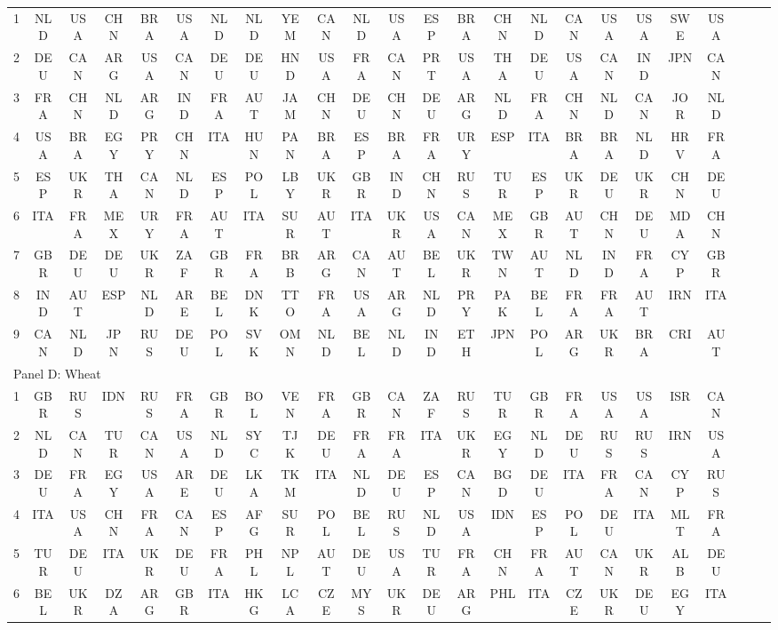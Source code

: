 \documentclass[preprint,3p,times,sort&compress]{elsarticle}
\begin{document}
\begin{table}[!ht]
\begin{tabular}{cccccccccccccccccccccccc}
      1 & NLD & USA & CHN & BRA & USA & NLD & NLD & YEM & CAN & NLD & USA & ESP & BRA & CHN & NLD & CAN & USA & USA & SWE & USA \\   
        2 & DEU & CAN & ARG & USA & CAN & DEU & DEU & HND & USA & FRA  & CAN & PRT & USA & THA & DEU & USA & CAN & IND & JPN & CAN \\  
        3 & FRA & CHN & NLD & ARG & IND & FRA & AUT & JAM & CHN & DEU & CHN & DEU & ARG & NLD & FRA & CHN & NLD & CAN & JOR & NLD \\  
        4 & USA & BRA & EGY & PRY & CHN & ITA & HUN & PAN & BRA & ESP & BRA & FRA & URY & ESP & ITA & BRA & BRA & NLD & HRV & FRA \\ 
        5 & ESP & UKR & THA & CAN & NLD & ESP & POL & LBY & UKR & GBR & IND & CHN & RUS & TUR & ESP & UKR & DEU & UKR & CHN & DEU \\ 
        6 & ITA & FRA & MEX & URY & FRA & AUT & ITA & SUR & AUT & ITA & UKR & USA & CAN & MEX & GBR & AUT & CHN & DEU & MDA & CHN \\  
        7 & GBR & DEU & DEU & UKR & ZAF & GBR & FRA & BRB & ARG & CAN & AUT & BEL & UKR & TWN & AUT & NLD & IND & FRA & CYP & GBR \\ 
        8 & IND & AUT & ESP & NLD & ARE & BEL & DNK & TTO & FRA & USA & ARG & NLD & PRY & PAK & BEL & FRA & FRA & AUT & IRN & ITA \\ 
        9 & CAN & NLD & JPN & RUS & DEU & POL & SVK & OMN & NLD & BEL & NLD & IND & ETH & JPN & POL & ARG & UKR & BRA & CRI & AUT \\ 
        \multicolumn{5}{l}{Panel D: Wheat}\\  
        1 & GBR & RUS & IDN & RUS & FRA & GBR & BOL & VEN & FRA & GBR & CAN & ZAF & RUS & TUR & GBR & FRA & USA & USA & ISR & CAN \\  
        2 & NLD & CAN & TUR & CAN & USA & NLD & SYC & TJK & DEU & FRA & FRA & ITA & UKR & EGY & NLD & DEU & RUS & RUS & IRN & USA \\
        3 & DEU & FRA & EGY & USA & ARE & DEU & LKA & TKM & ITA & NLD & DEU & ESP & CAN & BGD & DEU & ITA & FRA & CAN & CYP & RUS \\ 
        4 & ITA & USA & CHN & FRA & CAN & ESP & AFG & SUR & POL & BEL & RUS & NLD & USA & IDN & ESP & POL & DEU & ITA & MLT & FRA \\ 
        5 & TUR & DEU & ITA & UKR & DEU & FRA & PHL & NPL & AUT & DEU & USA & TUR & FRA & CHN & FRA & AUT & CAN & UKR & ALB & DEU \\ 
        6 & BEL & UKR & DZA & ARG & GBR & ITA & HKG & LCA & CZE & MYS & UKR & DEU & ARG & PHL & ITA & CZE & UKR & DEU & EGY & ITA \\   

\end{tabular}
\end{table}
\end{document}
